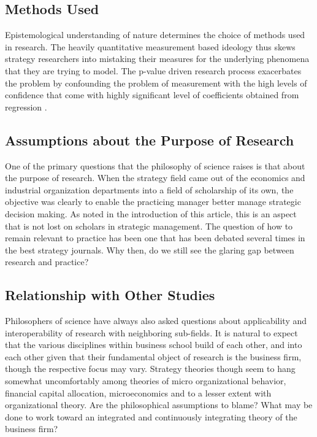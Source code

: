 \documentclass[12pt,letterpaper]{article}
\begin{document}
\subsection{Methods Used}
Epistemological understanding of nature determines the choice of methods used in research. The heavily quantitative measurement based ideology thus skews strategy researchers into mistaking their measures for the underlying phenomena that they are trying to model. The p-value driven research process exacerbates the problem by confounding the problem of measurement with the high levels of confidence that come with highly significant level of coefficients obtained from regression \citep{Bettis2014}.

\subsection{Assumptions about the Purpose of Research}
One of the primary questions that the philosophy of science raises is that about the purpose of research. When the strategy field came out of the economics and industrial organization departments into a field of scholarship of its own, the objective was clearly to enable the practicing manager better manage strategic decision making. As noted in the introduction of this article, this is an aspect that is not lost on scholars in strategic management. The question of how to remain relevant to practice has been one that has been debated several times in the best strategy journals. Why then, do we still see the glaring gap between research and practice?

\subsection{Relationship with Other Studies}
Philosophers of science have always also asked questions about applicability and interoperability of research with neighboring sub-fields. It is natural to expect that the various disciplines within business school build of each other, and into each other given that their fundamental object of research is the business firm, though the respective focus may vary. Strategy theories though seem to hang somewhat uncomfortably among theories of micro organizational behavior, financial capital allocation, microeconomics and to a lesser extent with organizational theory. Are the philosophical assumptions to blame? What may be done to work toward an integrated and continuously integrating theory of the business firm?
\end{document}
